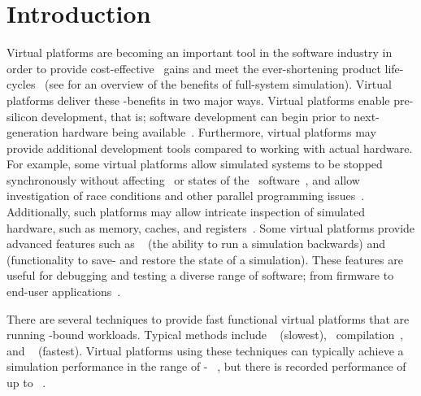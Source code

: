 
\chapter{Introduction}
\label{cha:introduction}
Virtual platforms are becoming an important tool in the software industry in order to provide cost-effective \dvttermttm\ gains and meet the ever-shortening product life-cycles~ (see  for an overview of the benefits of full-system simulation).
Virtual platforms deliver these \dvttermttm -benefits in two major ways.
Virtual platforms enable pre-silicon development, that is; software development can begin prior to next-generation hardware being available~.
Furthermore, virtual platforms may provide additional development tools compared to working with actual hardware.
For example, some virtual platforms allow simulated systems to be stopped synchronously without affecting \dvttermtiming\ or states of the \dvttermtarget\ software~, and allow investigation of race conditions and other parallel programming issues~.
Additionally, such platforms may allow intricate inspection of simulated hardware, such as memory, caches, and registers~.
Some virtual platforms provide advanced features such as \dvttermreverseexecution ~ (the ability to run a simulation backwards) and \dvttermcheckpointing ~ (functionality to save- and restore the state of a simulation).
These features are useful for debugging and testing a diverse range of software; from firmware to end-user applications~.

There are several techniques to provide fast functional virtual platforms that are running \dvttermcpu -bound workloads.
Typical methods include \dvtterminterpretation ~ (slowest), \dvttermjit\ compilation~, and \dvttermdirectvirtualization ~ (fastest).
Virtual platforms using these techniques can typically achieve a simulation performance in the range of - \dvttermmipsecond ~, but there is recorded performance of up to  \dvttermmipsecond ~.

